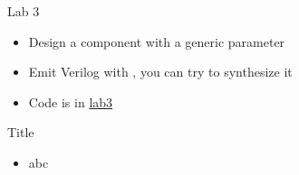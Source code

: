 \begin{frame}[fragile]{Lab 3}
\begin{itemize}
\item Design a component with a generic parameter
\item Emit Verilog with , you can try to synthesize it
\item Code is in \href{https://github.com/schoeberl/agile-hw/tree/main/lab3}{lab3}
\end{itemize}
\end{frame}



\begin{frame}[fragile]{Title}
\begin{itemize}
\item abc
\end{itemize}
\end{frame}
